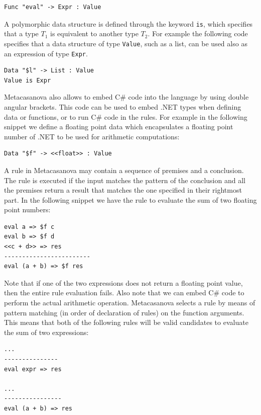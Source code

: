 \begin{lstlisting}
Func "eval" -> Expr : Value
\end{lstlisting}

\noindent
A polymorphic data structure is defined through the keyword \texttt{is}, which specifies that a type $T_1$ is equivalent to another type $T_2$. For example the following code specifies that a data structure of type \texttt{Value}, such as a list, can be used also as an expression of type \texttt{Expr}.

\begin{lstlisting}
Data "$l" -> List : Value 
Value is Expr
\end{lstlisting}

Metacasanova also allows to embed C\# code into the language by using double angular brackets. This code can be used to embed .NET types when defining data or functions, or to run C\# code in the rules. For example in the following snippet we define a floating point data which encapsulates a floating point number of .NET to be used for arithmetic computations:

\begin{lstlisting}
Data "$f" -> <<float>> : Value
\end{lstlisting}

\noindent
A rule in Metacasanova may contain a sequence of premises and a conclusion. The rule is executed if the input matches the pattern of the conclusion and all the premises return a result that matches the one specified in their rightmost part. In the following snippet we have the rule to evaluate the sum of two floating point numbers:

\begin{lstlisting}
eval a => $f c
eval b => $f d
<<c + d>> => res
------------------------
eval (a + b) => $f res
\end{lstlisting}

\noindent
Note that if one of the two expressions does not return a floating point value, then the entire rule evaluation fails. Also note that we can embed C\# code to perform the actual arithmetic operation. Metacasanova selects a rule by means of pattern matching (in order of declaration of rules) on the function arguments. This means that both of the following rules will be valid candidates to evaluate the sum of two expressions:

\begin{lstlisting}
...
---------------
eval expr => res

...
----------------
eval (a + b) => res
\end{lstlisting} 

